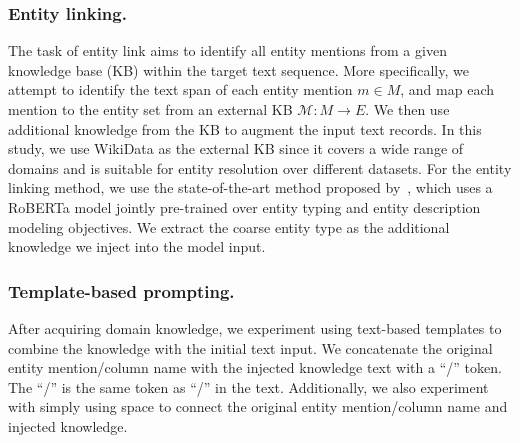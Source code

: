 




\subsubsection{Entity linking.}
The task of entity link aims to identify all entity mentions from a given knowledge base (KB) within the target text sequence. More specifically, we attempt to identify the text span of each entity mention $m \in M$, and map each mention to the entity set from an external KB $\mathcal{M}: M \rightarrow E$. 
We then use additional knowledge from the KB to augment the input text records.
In this study, we use WikiData as the external KB since it covers a wide range of domains and is suitable for entity resolution over different datasets. For the entity linking method, we use the state-of-the-art method proposed by~\citet{ayoola_refined_2022}, which uses a RoBERTa model jointly pre-trained over entity typing and entity description modeling objectives. We extract the coarse entity type as the additional knowledge we inject into the model input.


\subsubsection{Template-based prompting.}
After acquiring domain knowledge, we experiment using text-based templates to combine the knowledge with the initial text input. We concatenate the original entity mention/column name with the injected knowledge text with a ``/'' token. The ``/'' is the same token as ``/'' in the text. 
Additionally, we also experiment with simply using space to connect the original entity mention/column name and injected knowledge. 


